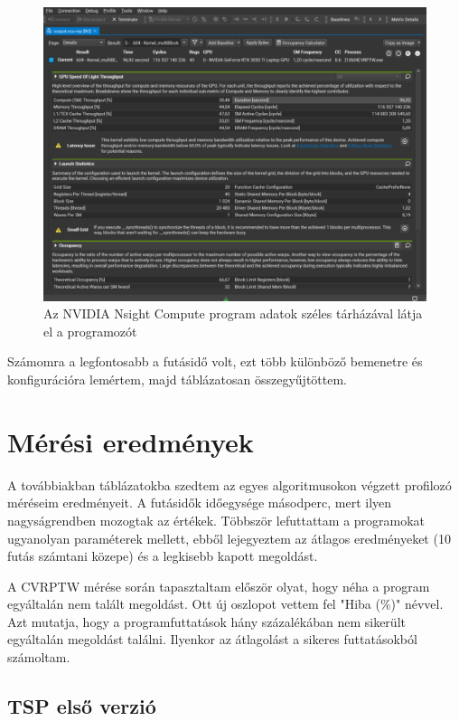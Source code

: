 \begin{figure}[ht!]
	\centering
	\includegraphics[width=125mm, keepaspectratio]{figures/nsight-compute2.png}
	\caption{Az NVIDIA Nsight Compute program adatok széles tárházával látja el a programozót }
	\label{fig:nsight-compute}
\end{figure}




Számomra a legfontosabb a futásidő volt, ezt több különböző bemenetre és konfigurációra lemértem, majd táblázatosan összegyűjtöttem.

\section{Mérési eredmények}

A továbbiakban táblázatokba szedtem az egyes algoritmusokon végzett profilozó méréseim eredményeit. A futásidők időegysége másodperc, mert ilyen nagyságrendben mozogtak az értékek. Többször lefuttattam a programokat ugyanolyan paraméterek mellett, ebből lejegyeztem az átlagos eredményeket (10 futás számtani közepe) és a legkisebb kapott megoldást. 

A CVRPTW mérése során tapasztaltam először olyat, hogy néha a program egyáltalán nem talált megoldást. Ott új oszlopot vettem fel "Hiba (\%)" névvel. Azt mutatja, hogy a programfuttatások hány százalékában nem sikerült egyáltalán megoldást találni. Ilyenkor az átlagolást a sikeres futtatásokból számoltam.

\newpage
\newpage

\subsection{TSP első verzió}

